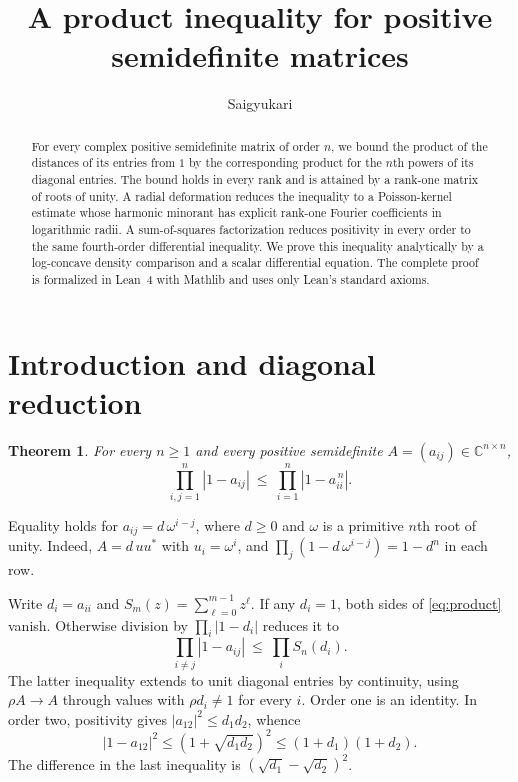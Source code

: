 \documentclass[10pt,twoside,reqno]{amsart}
\title[A product inequality for positive semidefinite matrices]
      {A product inequality for positive semidefinite matrices}
\author[Saigyukari]{Saigyukari}
\date{}
\newtheorem{theorem}{Theorem}
\numberwithin{equation}{section}
\newcommand{\C}{\mathbb C}
\begin{document}
\begin{abstract}
For every complex positive semidefinite matrix of order \(n\), we bound the
product of the distances of its entries from \(1\) by the corresponding
product for the \(n\)th powers of its diagonal entries. The bound holds in
every rank and is attained by a rank-one matrix of roots of unity.
A radial deformation reduces the inequality to a Poisson-kernel estimate
whose harmonic minorant has explicit rank-one Fourier coefficients in
logarithmic radii. A sum-of-squares factorization reduces positivity in every
order to the same fourth-order differential inequality. We prove this inequality analytically by a log-concave density comparison
and a scalar differential equation. The complete proof is formalized in
Lean~4 with Mathlib and uses only Lean's standard axioms.
\end{abstract}
\maketitle

\section{Introduction and diagonal reduction}

\begin{theorem}\label{thm:product}
For every \(n\ge1\) and every positive semidefinite \(A=(a_{ij})\in\C^{n\times n}\),
\begin{equation}\label{eq:product}
 \prod_{i,j=1}^{n}|1-a_{ij}|
 \ \le\ \prod_{i=1}^{n}|1-a_{ii}^{\,n}|.
\end{equation}
\end{theorem}

Equality holds for \(a_{ij}=d\,\omega^{i-j}\), where \(d\ge0\) and
\(\omega\) is a primitive \(n\)th root of unity. Indeed, \(A=d\,u u^*\)
with \(u_i=\omega^i\), and \(\prod_j(1-d\,\omega^{i-j})=1-d^n\) in each row.

Write \(d_i=a_{ii}\) and \(S_m(z)=\sum_{\ell=0}^{m-1}z^\ell\).
If any \(d_i=1\), both sides of \eqref{eq:product} vanish. Otherwise division
by \(\prod_i|1-d_i|\) reduces it to
\begin{equation}\label{eq:cancel}
 \prod_{i\ne j}|1-a_{ij}|\ \le\ \prod_i S_n(d_i).
\end{equation}
The latter inequality extends to unit diagonal entries by continuity, using
\(\rho A\to A\) through values with \(\rho d_i\ne1\) for every \(i\).
Order one is an identity. In order two, positivity gives
\(|a_{12}|^2\le d_1d_2\), whence
\[
 |1-a_{12}|^2\le(1+\sqrt{d_1d_2})^2\le(1+d_1)(1+d_2).
\]
The difference in the last inequality is \((\sqrt{d_1}-\sqrt{d_2})^2\).
\end{document}
